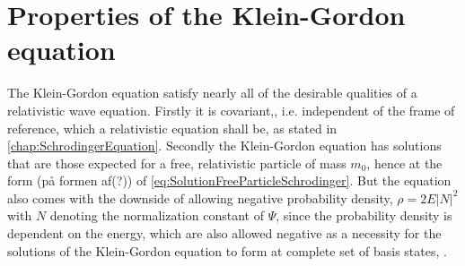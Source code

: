 \section{Properties of the Klein-Gordon equation}
The Klein-Gordon equation satisfy nearly all of the desirable qualities of a relativistic wave equation. Firstly it is covariant,\cite[p.~489]{sakurai_modern_2011}, i.e. independent of the frame of reference, which a relativistic equation shall be, as stated in \cref{chap:SchrodingerEquation}. Secondly the Klein-Gordon equation has solutions that are those expected for a free, relativistic particle of mass $m_0$, hence at the form (på formen af(?)) of \cref{eq:SolutionFreeParticleSchrodinger}. But the equation also comes with the downside of allowing negative probability density, $\rho = 2E|N|^2$ with $N$ denoting the normalization constant of $\Psi$, since the probability density is dependent on the energy, which are also allowed negative as a necessity for the solutions of the Klein-Gordon equation to form at complete set of basis states, \cite[p.~488]{sakurai_modern_2011}.
